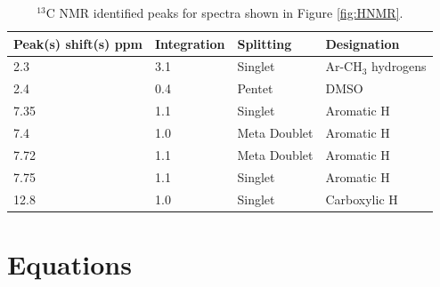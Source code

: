 \documentclass[8.5pt,twoside,twocolumn]{article}
\begin{document}
\begin{table}[h]
\small
  \caption{$^{13}$C NMR identified peaks for spectra shown in Figure \ref{fig:HNMR}.}
  \label{table:HNMR}
  \begin{tabular*}{0.5\textwidth}{@{\extracolsep{\fill}}llll}
    \hline
    Peak(s) shift(s) ppm & Integration & Splitting & Designation \\
    \hline
    2.3 & 3.1 & Singlet & Ar-CH$_3$ hydrogens\\
    2.4 & 0.4 & Pentet & DMSO\\
    7.35 & 1.1 & Singlet & Aromatic H\\
    7.4 & 1.0 &  Meta Doublet & Aromatic H\\
    7.72 & 1.1 & Meta Doublet & Aromatic H\\
    7.75 & 1.1 & Singlet & Aromatic H\\
    12.8 & 1.0 & Singlet & Carboxylic H\\
    \hline
  \end{tabular*}
\end{table}

\section{Equations}







\footnotesize{
}
\end{document}
